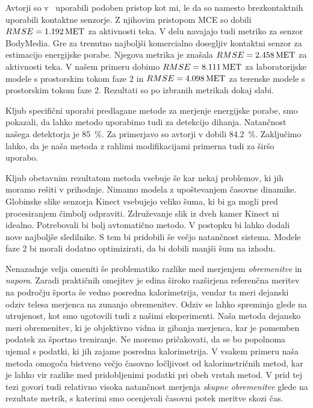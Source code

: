 Avtorji so v~\cite{gjoreski2015context} uporabili podoben pristop kot mi, le da so namesto brezkontaktnih uporabili kontaktne senzorje. Z njihovim pristopom MCE so dobili ${RMSE}=\SI{1.192}{MET}$ za aktivnosti teka. V delu navajajo tudi metriko za senzor BodyMedia. Gre za trenutno najboljši komercialno dosegljiv kontaktni senzor za estimacijo energijske porabe. Njegova metrika je znašala ${RMSE}=\SI{2.458}{MET}$ za aktivnosti teka. V našem primeru dobimo ${RMSE}=\SI{8.111}{MET}$ za laboratorijske modele s prostorskim tokom faze 2 in ${RMSE}=\SI{4.098}{MET}$ za terenske modele s prostorskim tokom faze 2. Rezultati so po izbranih metrikah dokaj slabi. 

Kljub specifični uporabi predlagane metode za merjenje energijske porabe, smo pokazali, da lahko metodo uporabimo tudi za detekcijo dihanja. Natančnost našega detektorja je \SI{85}{\%}. Za primerjavo so avtorji v \cite{nakajima2001development} dobili \SI{84.2}{\%}. Zaključimo lahko, da je naša metoda z rahlimi modifikacijami primerna tudi za širšo uporabo.

Kljub obetavnim rezultatom metoda vsebuje še kar nekaj problemov, ki jih moramo rešiti v prihodnje. Nimamo modela z upoštevanjem časovne dinamike. Globinske slike senzorja Kinect vsebujejo veliko šuma, ki bi ga mogli pred procesiranjem čimbolj odpraviti. Združevanje slik iz dveh kamer Kinect ni idealno. Potrebovali bi bolj avtomatično metodo. V postopku bi lahko dodali nove najboljše sledilnike. S tem bi pridobili še večjo natančnost sistema. Modele faze 2 bi morali dodatno optimizirati, da bi dobili manjši šum na izhodu.

Nenazadnje velja omeniti še problematiko razlike med merjenjem \emph{obremenitve} in \emph{napora}. Zaradi praktičnih omejitev je edina široko razširjena referenčna meritev na področju športa še vedno posredna kalorimetrija, vendar ta meri dejanski odziv telesa merjenca na zunanjo obremenitev. Odziv se lahko spreminja glede na utrujenost, kot smo ugotovili tudi z našimi eksperimenti. Naša metoda dejansko meri obremenitev, ki je objektivno vidna iz gibanja merjenca, kar je pomemben podatek za športno treniranje. Ne moremo pričakovati, da se bo popolnoma ujemal s podatki, ki jih zajame posredna kalorimetrija. V vsakem primeru naša metoda omogoča bistveno večjo časovno ločljivost od kalorimetričnih metod, kar je lahko vir razlike med pridobljenimi podatki pri obeh vrstah metod. V prid tej tezi govori tudi relativno visoka natančnost merjenja \emph{skupne obremenitve} glede na rezultate metrik, s katerimi smo ocenjevali časovni potek meritve skozi čas.
